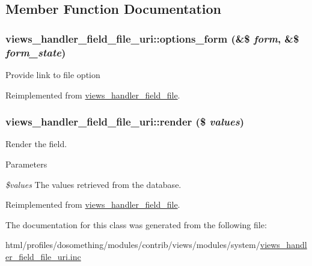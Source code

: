 \subsection{Member Function Documentation}
\hypertarget{classviews__handler__field__file__uri_aef98f71a75b7285bcb2dc6c7ddaebc55}{
\subsubsection[{options\_\-form}]{\setlength{\rightskip}{0pt plus 5cm}views\_\-handler\_\-field\_\-file\_\-uri::options\_\-form (\&\$ {\em form}, \/  \&\$ {\em form\_\-state})}}
\label{classviews__handler__field__file__uri_aef98f71a75b7285bcb2dc6c7ddaebc55}
Provide link to file option 

Reimplemented from \hyperlink{classviews__handler__field__file_aab95242357e45be9c4fbbced1f625d7b}{views\_\-handler\_\-field\_\-file}.\hypertarget{classviews__handler__field__file__uri_af0c5416bd2f6c9c2e3cd1b73f7bf1c0f}{
\subsubsection[{render}]{\setlength{\rightskip}{0pt plus 5cm}views\_\-handler\_\-field\_\-file\_\-uri::render (\$ {\em values})}}
\label{classviews__handler__field__file__uri_af0c5416bd2f6c9c2e3cd1b73f7bf1c0f}
Render the field.


\begin{DoxyParams}{Parameters}
\item[{\em \$values}]The values retrieved from the database. \end{DoxyParams}


Reimplemented from \hyperlink{classviews__handler__field__file_a624c3ed9f9f4b194e2a9a0b7d6acb384}{views\_\-handler\_\-field\_\-file}.

The documentation for this class was generated from the following file:\begin{DoxyCompactItemize}
\item 
html/profiles/dosomething/modules/contrib/views/modules/system/\hyperlink{views__handler__field__file__uri_8inc}{views\_\-handler\_\-field\_\-file\_\-uri.inc}\end{DoxyCompactItemize}
